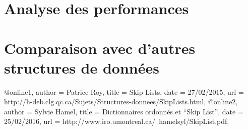 \documentclass[a4paper, 12pt]{article}
\begin{document}
	\section{Analyse des performances}
	\section{Comparaison avec d'autres structures de données}
	
	@online{1,
		author = {Patrice Roy},
		title = {Skip Lists},
		date = {27/02/2015},
		url = {http://h-deb.clg.qc.ca/Sujets/Structures-donnees/SkipLists.html},
	}
	@online{2,
		author = {Sylvie Hamel},
		title = {Dictionnaires ordonnés et “Skip List”},
		date = {25/02/2016},
		url = {http://www.iro.umontreal.ca/~hamelsyl/SkipList.pdf},
	}
	
\end{document}
